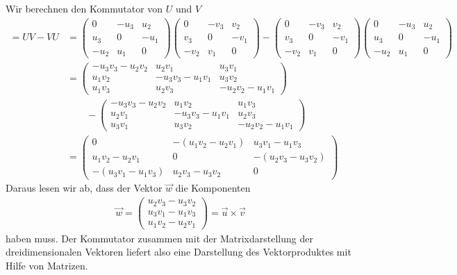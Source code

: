 \begin{loesung}
Wir berechnen den Kommutator von $U$ und $V$
\begin{align*}
[U,V]
=
UV-VU
&=
\begin{pmatrix}
   0&-u_3& u_2\\
 u_3&   0&-u_1\\
-u_2& u_1&   0
\end{pmatrix}
\begin{pmatrix}
   0&-v_3& v_2\\
 v_3&   0&-v_1\\
-v_2& v_1&   0
\end{pmatrix}
-
\begin{pmatrix}
   0&-v_3& v_2\\
 v_3&   0&-v_1\\
-v_2& v_1&   0
\end{pmatrix}
\begin{pmatrix}
   0&-u_3& u_2\\
 u_3&   0&-u_1\\
-u_2& u_1&   0
\end{pmatrix}
\\
&=
\begin{pmatrix}
-u_3v_3-u_2v_2&u_2v_1&u_3v_1\\
u_1v_2&-u_3v_3-u_1v_1&u_3v_2\\
u_1v_3&u_2v_3&-u_2v_2-u_1v_1
\end{pmatrix}
\\&\qquad
-
\begin{pmatrix}
-u_3v_3-u_2v_2&u_1v_2&u_1v_3\\
u_2v_1&-u_3v_3-u_1v_1&u_2v_3\\
u_3v_1&u_3v_2&-u_2v_2-u_1v_1
\end{pmatrix}
\\
&=\begin{pmatrix}
   0            &-(u_1v_2-u_2v_1)&u_3v_1-u_1v_3   \\
   u_1v_2-u_2v_1&               0&-(u_2v_3-u_3v_2)\\
-(u_3v_1-u_1v_3)&u_2v_3-u_3v_2   &0
\end{pmatrix}
\end{align*}
Daraus lesen wir ab, dass der Vektor $\vec w$ die Komponenten
\begin{align*}
\vec w
=
\begin{pmatrix}
u_2v_3-u_3v_2\\
u_3v_1-u_1v_3\\
u_1v_2-u_2v_1
\end{pmatrix}
=\vec u\times\vec v
\end{align*}
haben muss.
Der Kommutator zusammen mit der Matrixdarstellung der dreidimensionalen
Vektoren liefert also eine Darstellung des Vektorproduktes mit Hilfe von
Matrizen.
\end{loesung}

